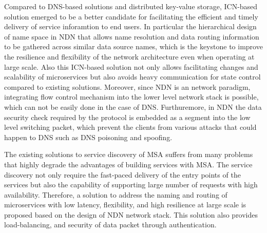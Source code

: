 Compared to DNS-based solutions and distributed key-value storage, ICN-based\cite{Ahlgren} solution emerged to be a better candidate for facilitating the efficient and timely delivery of service inforamtion to end users. In particular the hierarchical design of name space in NDN\cite{ndn,zhang2014named} that allows name resolution and data routing information to be gathered across similar data source names, which is the keystone to improve the resilience and flexibility of the network architecture even when operating at large scale. Also this ICN-based solution not only allows facilitating changes and scalability of microservices but also avoids heavy communication for state control compared to existing solutions. Moreover, since NDN is an network paradigm, integrating flow control mechanism into the lower level network stack is possible, which can not be easily done in the case of DNS. Furthuremore, in NDN the data security check required by the protocol is embedded as a segment into the low level switching packet, which prevent the clients from various attacks that could happen to DNS such as DNS poisoning and spoofing. 

The existing solutions to service discovery of MSA suffers from many problems that highly degrade the advantages of building services with MSA. The service discovery not only require the fast-paced delivery of the entry points of the services but also the capability of supporting large number of requests with high availability. Therefore, a solution to address the naming and routing of microservices with low latency, flexibility, and high resilience at large scale is proposed based on the design of NDN network stack. This solution also provides load-balancing, and security of data packet through authentication.
